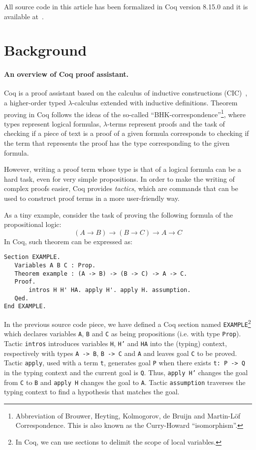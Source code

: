 \documentclass[sigconf]{acmart}
\begin{document}
All source code in this article has been formalized in Coq version 8.15.0 and it
is available at~\cite{modal-coq-lib}.

\section{Background}\label{sec:background}

\paragraph{An overview of Coq proof assistant.}

Coq is a proof assistant based on the calculus of inductive
constructions (CIC)~\cite{manual_cic}, a higher-order typed
$\lambda$-calculus extended with inductive definitions.  Theorem
proving in Coq follows the ideas of the so-called
``BHK-cor\-res\-pon\-dence''\footnote{Abbreviation of Brouwer, Heyting,
  Kolmogorov, de Bruijn and Martin-L\"of Correspondence. This is also
  known as the Curry-Howard ``isomorphism''.}, where types represent
logical formulas, $\lambda$-terms represent proofs
\cite{Bertot10} and the task of checking if a piece of text is a
proof of a given formula corresponds to checking if the term that
represents the proof has the type corresponding to the given formula.

However, writing a proof term whose type is that of a logical formula
can be a hard task, even for very simple propositions.  In order to
make the writing of complex proofs easier, Coq provides
\emph{tactics}, which are commands that can be used to construct proof
terms in a more user-friendly way.

As a tiny example, consider the task of proving the following 
formula of the propositional logic:
\[
(A \to B)\to (B\to C) \to A \to C
\]
In Coq, such theorem can be expressed as:
\begin{verbatim}
Section EXAMPLE.
   Variables A B C : Prop.
   Theorem example : (A -> B) -> (B -> C) -> A -> C.
   Proof.
       intros H H' HA. apply H'. apply H. assumption. 
   Qed.
End EXAMPLE.
\end{verbatim}
In the previous source code piece, we have defined a Coq section named
\texttt{EXAMPLE}\footnote{In Coq, we can use sections to delimit the
  scope of local variables.} which declares variables \texttt{A},
\texttt{B} and \texttt{C} as being propositions (i.e. with type
\texttt{Prop}). Tactic \texttt{intros} introduces variables
\texttt{H}, \texttt{H'} and \texttt{HA} into the (typing) context,
respectively with types \texttt{A -> B}, \texttt{B -> C} and
\texttt{A} and leaves goal \texttt{C} to be proved. Tactic
\texttt{apply}, used with a term \texttt{t}, generates goal
\texttt{P}
when there exists \texttt{t: P -> Q} in the typing context and the
current goal is \texttt{Q}. Thus, \texttt{apply H'} changes the goal
from \texttt{C} to \texttt{B} and \texttt{apply H}
changes the goal to \texttt{A}. Tactic \texttt{assumption}
traverses the typing context to find a hypothesis that matches the goal.
\end{document}
